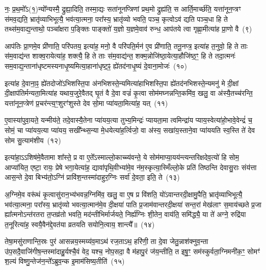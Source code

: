 नः॒ प्र॒थ॒मो᳚\-ऽ(१॒)न्यो᳚न्यस्मै॒ द्रुह्या॒दिति॒ तस्मा॒द्यः सता॑नूनप्त्रिणां प्रथ॒मो द्रुह्य॑ति॒ स आर्ति॒मार्च्छ॑ति॒ यत्ता॑नून॒प्त्रꣳ स॑मव॒द्यति॒ भ्रातृ॑व्याभिभूत्यै॒ भव॑त्या॒त्मना॒ परा᳚स्य॒ भ्रातृ॑व्यो भवति॒ पञ्च॒ कृत्वो\-ऽव॑ द्यति पञ्च॒धा हि ते तथ्स॑म॒वाद्य॒न्ताथो॒ पञ्चा᳚क्षरा प॒ङ्क्तिः पाङ्क्तो॑ य॒ज्ञो य॒ज्ञमे॒वाव॑ रुन्ध॒ आप॑तये त्वा गृह्णा॒मीत्या॑ह प्रा॒णो वै~(९)\ip

आप॑तिः प्रा॒णमे॒व प्री॑णाति॒ परि॑पतय॒ इत्या॑ह॒ मनो॒ वै परि॑पति॒र्मन॑ ए॒व प्री॑णाति॒ तनू॒नप्त्र॒ इत्या॑ह त॒नुवो॒ हि ते ताः स॑म॒वाद्य॑न्त शाक्व॒रायेत्या॑ह॒ शक्त्यै॒ हि ते ताः स॑म॒वाद्य॑न्त॒ शक्म॒न्नोजि॑ष्ठा॒येत्या॒हौजि॑ष्ठ॒ꣳ॒ हि ते तदा॒त्मनः॑ सम॒वाद्य॒न्ताना॑धृष्टमस्यनाधृ॒ष्यमित्या॒हाना॑धृष्ट॒ꣴ॒ ह्ये॑तद॑नाधृ॒ष्यं दे॒वाना॒मोजः॑~(१०)\ip

इत्या॑ह दे॒वाना॒ꣴ॒ ह्ये॑तदोजो॑\-ऽभिशस्ति॒पा अ॑नभिशस्ते॒न्यमित्या॑हाभिशस्ति॒पा ह्ये॑तद॑नभिशस्ते॒न्यमनु॑ मे दी॒क्षां दी॒क्षाप॑तिर्मन्यता॒मित्या॑ह यथाय॒जुरे॒वैतद् घृ॒तं वै दे॒वा वज्रं॑ कृ॒त्वा सोम॑मघ्नन्नन्ति॒कमि॑व॒ खलु॒ वा अ॑स्यै॒तच्च॑रन्ति॒ यत्ता॑नून॒प्त्रेण॑ प्र॒चर॑न्त्य॒ꣳ॒शुरꣳ॑शुस्ते देव सो॒मा प्या॑यता॒मित्या॑ह॒ यत्~(११)\ip

ए॒वास्या॑पुवा॒यते॒ यन्मीय॑ते॒ तदे॒वास्यै॒तेना प्या॑यय॒त्या तुभ्य॒मिन्द्रः॑ प्यायता॒मा त्वमिन्द्रा॑य प्याय॒स्वेत्या॑हो॒भावे॒वेन्द्रं॑ च॒ सोमं॒ चा प्या॑यय॒त्या प्या॑यय॒ सखी᳚न्थ्स॒न्या मे॒धयेत्या॑ह॒र्त्विजो॒ वा अ॑स्य॒ सखा॑य॒स्ताने॒वा प्या॑ययति स्व॒स्ति ते॑ देव सोम सु॒त्याम॑शीय~(१२)\ip

इत्या॑हा॒\-ऽऽ\-शिष॑मे॒वैतामा शा᳚स्ते॒ प्र वा ए॒ते᳚\-ऽस्माल्लो॒काच्च्य॑वन्ते॒ ये सोम॑\-माप्या॒यय॑न्त्यन्त\-रिक्षदेव॒त्यो॑ हि सोम॒ आप्या॑यित॒ एष्टा॒ रायः॒ प्रेषे भगा॒येत्या॑ह॒ द्यावा॑\-पृथि॒वीभ्या॑मे॒व न॑म॒स्कृत्या॒स्मिँल्लो॒के प्रति॑ तिष्ठन्ति देवासु॒राः संय॑त्ता आस॒न्ते दे॒वा बिभ्य॑तो॒\-ऽग्निं प्रावि॑श॒न्तस्मा॑दाहुर॒ग्निः सर्वा॑ दे॒वता॒ इति॒ ते~(१३)\ip

अ॒ग्निमे॒व वरू॑थं कृ॒त्वासु॑रान॒भ्य॑भवन्न॒ग्निमि॑व॒ खलु॒ वा ए॒ष प्र वि॑शति॒ यो॑\-ऽवान्तरदी॒क्षामु॒पैति॒ भ्रातृ॑व्याभिभूत्यै॒ भव॑त्या॒त्मना॒ परा᳚स्य॒ भ्रातृ॑व्यो भवत्या॒त्मान॑मे॒व दी॒क्षया॑ पाति प्र॒जाम॑वान्तरदी॒क्षया॑ सन्त॒रां मेख॑लाꣳ स॒माय॑च्छते प्र॒जा ह्या᳚त्मनो\-ऽन्त॑रतरा त॒प्तव्र॑तो भवति॒ मद॑न्तीभिर्मार्जयते॒ निर्\mbox{}ह्य॑ग्निः शी॒तेन॒ वाय॑ति॒ समि॑द्ध्यै॒ या ते॑ अग्ने॒ रुद्रि॑या त॒नूरित्या॑ह॒ स्वयै॒वैन॑द्दे॒वत॑या व्रतयति सयोनि॒त्वाय॒ शान्त्यै᳚॥~(१४)\ip

{\anuvakamend[{यो वा ओज॑ आह॒ यद॑शी॒येति॒ ते᳚\-ऽग्न॒ एका॑\-दश च}]}

तेषा॒मसु॑राणान्ति॒स्रः पुर॑ आसन्नय॒स्मय्य॑व॒मा\-ऽथ॑ रज॒ता\-ऽथ॒ हरि॑णी॒ ता दे॒वा जेतु॒न्नाश॑क्नुव॒न्ता उ॑प॒सदै॒वाजि॑गीष॒न्तस्मा॑दाहु॒र्यश्चै॒वं वेद॒ यश्च॒ नोप॒सदा॒ वै म॑हापु॒रं ज॑य॒न्तीति॒ त इषु॒ꣳ॒ सम॑स्कुर्वता॒ग्निमनी॑क॒ꣳ॒ सोमꣳ॑ श॒ल्यं विष्णु॒न्तेज॑न॒न्ते᳚\-ऽब्रुव॒न्क इ॒माम॑सिष्य॒तीति॑~(१५)\ip

